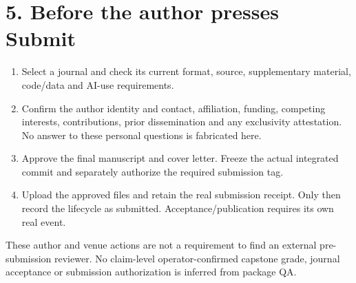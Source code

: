\documentclass[11pt]{article}
\begin{document}
\section*{5. Before the author presses Submit}
\begin{enumerate}[leftmargin=*]
\item Select a journal and check its current format, source, supplementary
material, code/data and AI-use requirements.
\item Confirm the author identity and contact, affiliation, funding,
competing interests, contributions, prior dissemination and any exclusivity
attestation. No answer to these personal questions is fabricated here.
\item Approve the final manuscript and cover letter. Freeze the actual
integrated commit and separately authorize the required submission tag.
\item Upload the approved files and retain the real submission receipt.
Only then record the lifecycle as submitted. Acceptance/publication requires
its own real event.
\end{enumerate}
These author and venue actions are not a requirement to find an external
pre-submission reviewer. No claim-level operator-confirmed capstone grade,
journal acceptance or submission authorization is inferred from package QA.
\end{document}
